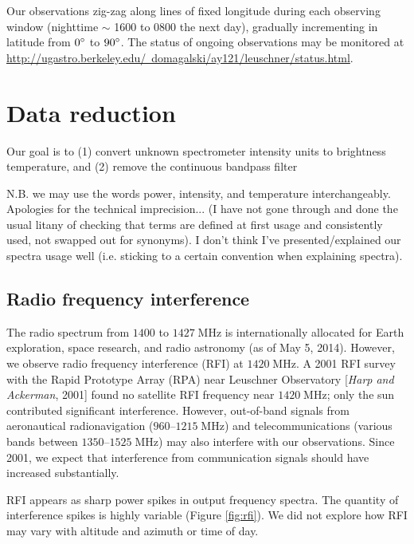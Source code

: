 \documentclass[10pt]{article}
\newcommand {\mt}{\mathrm}
\newcommand {\unit}[1]{\; \mt{#1}}
\begin{document}
Our observations zig-zag along lines of fixed longitude during each observing window (nighttime $\sim$ 1600 to 0800 the next day), gradually incrementing in latitude from $0\degree$ to $90\degree$.  The status of ongoing observations may be monitored at
\href{http://ugastro.berkeley.edu/~domagalski/ay121/leuschner/status.html}
{http://ugastro.berkeley.edu/~domagalski/ay121/leuschner/status.html}.

\section{Data reduction}

Our goal is to (1) convert unknown spectrometer intensity units to brightness temperature, and (2) remove the continuous bandpass filter

N.B. we may use the words power, intensity, and temperature interchangeably.  Apologies for the technical imprecision...  (I have not gone through and done the usual litany of checking that terms are defined at first usage and consistently used, not swapped out for synonyms).  I don't think I've presented/explained our spectra usage well (i.e. sticking to a certain convention when explaining spectra).

\subsection{Radio frequency interference}

The radio spectrum from $1400$ to $1427 \unit{MHz}$ is internationally allocated for Earth exploration, space research, and radio astronomy (as of May 5, 2014).  However, we observe radio frequency interference (RFI) at $1420\unit{MHz}$.  A 2001 RFI survey with the Rapid Prototype Array (RPA) near Leuschner Observatory [\textit{Harp and Ackerman}, 2001] found no satellite RFI frequency near $1420 \unit{MHz}$; only the sun contributed significant interference.  However, out-of-band signals from aeronautical radionavigation ($960$--$1215\unit{MHz}$) and telecommunications (various bands between $1350$--$1525\unit{MHz}$) may also interfere with our observations.  Since 2001, we expect that interference from communication signals should have increased substantially.

RFI appears as sharp power spikes in output frequency spectra.  The quantity of interference spikes is highly variable (Figure \ref{fig:rfi}).  We did not explore how RFI may vary with altitude and azimuth or time of day.
\end{document}
